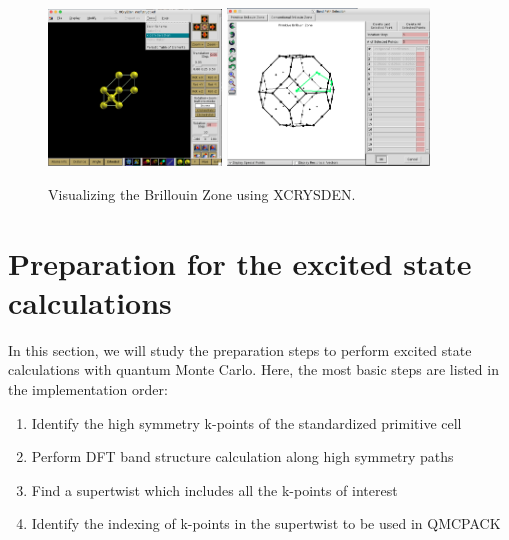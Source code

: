 \begin{figure}
	\hfill
	\includegraphics[width=0.41\textwidth]{./figures/lab_excited_xcrysden1}
	\includegraphics[width=0.48\textwidth]{./figures/lab_excited_xcrysden2}
	\hfill
	\caption{Visualizing the Brillouin Zone using XCRYSDEN.}
	\label{fig:lab5_xcrysden}
\end{figure}


\section{Preparation for the excited state calculations}\label{sec:lab5_prep}

In this section, we will study the preparation steps to perform excited state calculations with quantum Monte Carlo. 
Here, the most basic steps are listed in the implementation order:
\begin{enumerate}
	\item Identify the high symmetry k-points of the standardized primitive cell 
	\item Perform DFT band structure calculation along high symmetry paths
	\item Find a supertwist which includes all the k-points of interest
	\item Identify the indexing of k-points in the supertwist to be used in QMCPACK
\end{enumerate}

